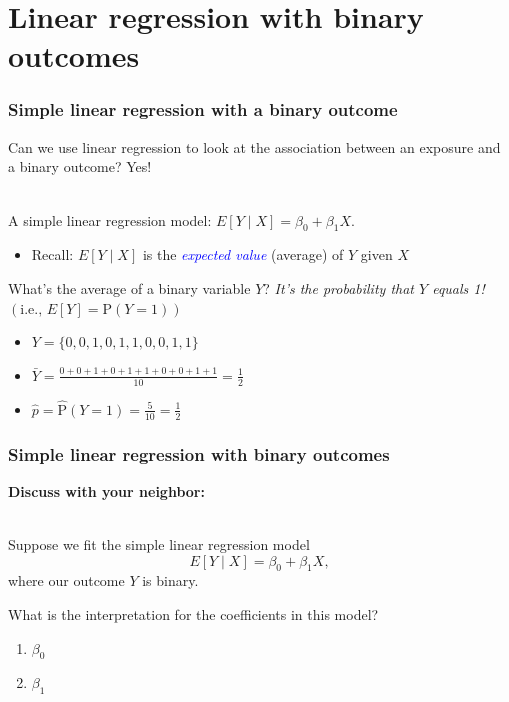 \documentclass[10pt,t]{beamer}
\begin{document}
\section{Linear regression with binary outcomes}
%	
\begin{frame}
	\frametitle{Simple linear regression with a binary outcome}
	Can we use linear regression to look at the association between an exposure and a binary outcome? Yes!
	\\ ~\
	
	A simple linear regression model: $E[Y \mid X] = \beta_0 + \beta_1 X$.
	\begin{footnotesize}
		\begin{itemize}
			\item Recall: $E[Y \mid X]$ is the \textcolor{blue}{\textit{expected value}} (average) of $Y$ given $X$ 
		\end{itemize}
	\end{footnotesize}
	 
	What's the average of a binary variable $Y$?   \textit{It's the probability that $Y$ equals 1!} $\left(\text{i.e., } E[Y] = \text{P}(Y=1)\right)$  
	
	\begin{itemize} \itemsep +12pt
		\item[] $Y = \{ 0, 0, 1, 0, 1, 1, 0, 0, 1, 1 \}$  
		\item[] $\bar{Y} = \frac{0 + 0 + 1 + 0 + 1 + 1 + 0 + 0 + 1 + 1}{10} = \frac{1}{2}$  
		\item[] $\hat{p} = \hat{\text{P}}(Y=1) = \frac{5}{10} = \frac{1}{2} $
	\end{itemize}
\end{frame}

\begin{frame}
	\frametitle{Simple linear regression with binary outcomes}
	\textbf{Discuss with your neighbor:} 
	\\ ~\ 
	
	Suppose we fit the simple linear regression model $$E[Y \mid X] = \beta_0 + \beta_1 X,$$ where our outcome $Y$ is binary.
	
	What is the interpretation for the coefficients in this model?
	
	\begin{enumerate}
			\item $\beta_0$
			\item $\beta_1$
		\end{enumerate} 
\end{frame}
\end{document}
